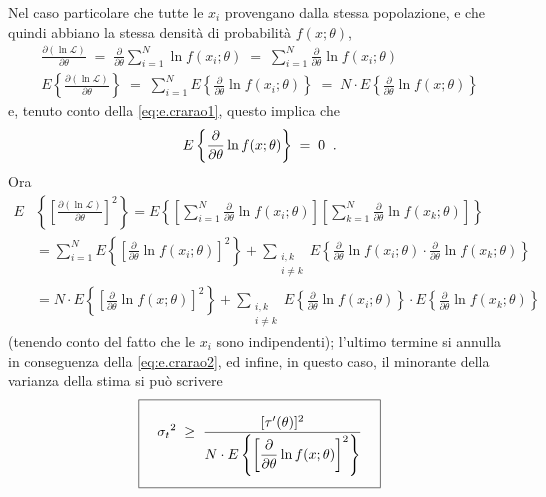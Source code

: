 Nel caso particolare che tutte le $x_i$ provengano dalla
stessa popolazione, e che quindi abbiano la stessa densit\`a
di probabilit\`a $f(x;\theta)$,
\begin{gather*}
  \frac{\partial (\ln  \mathcal{L})}{\partial \theta} \; =
    \; \frac{\partial}{\partial \theta} \sum_{i=1}^N \ln
    f(x_i; \theta) \; = \; \sum_{i=1}^N
    \frac{\partial}{\partial \theta} \ln f(x_i; \theta)
    \\[1ex]
  E \left\{ \frac{\partial (\ln \mathcal{L})}{\partial
    \theta} \right\} \; = \; \sum_{i=1}^N E \left\{
    \frac{\partial}{\partial \theta} \ln f(x_i; \theta)
    \right\} \; = \; N \cdot E \left\{
    \frac{\partial}{\partial \theta} \ln f(x; \theta)
    \right\}
\end{gather*}
e, tenuto conto della \eqref{eq:e.crarao1}, questo implica
che
\begin{equation} \label{eq:e.crarao2}
  E \left\{ \frac{\partial}{\partial \theta} \ln f(x;
    \theta) \right\} \; = \; 0 \;\; .
\end{equation}
Ora
\begin{equation*}
  \begin{split}
    E &\left\{ \left[ \frac{\partial (\ln
      \mathcal{L})}{\partial \theta} \right]^2 \right\} = E
      \left\{ \left[ \sum_{i=1}^N \frac{\partial}{\partial
      \theta} \ln f(x_i; \theta) \right] \left[ \sum_{k=1}^N
      \frac{\partial}{\partial \theta} \ln f(x_k; \theta)
      \right] \right\} \\[1ex]
    &= \sum_{i=1}^N E \left\{ \left[
      \frac{\partial}{\partial \theta} \ln f(x_i; \theta)
      \right]^2 \right\} + \sum_{\substack{i,k\\ i \ne k}} E
      \left\{ \frac{\partial}{\partial \theta} \ln f(x_i;
      \theta) \cdot \frac{\partial}{\partial \theta} \ln
      f(x_k; \theta) \right\} \\[1ex]
    &= N \cdot E \left\{ \left[ \frac{\partial}{\partial
      \theta} \ln f(x; \theta) \right]^2 \right\} +
      \sum_{\substack{i,k\\ i \ne k}} E \left\{
      \frac{\partial}{\partial \theta} \ln f(x_i; \theta)
      \right\} \cdot E \left\{ \frac{\partial}{\partial
      \theta} \ln f(x_k; \theta) \right\}
  \end{split}
\end{equation*}
(tenendo conto del fatto che le $x_i$ sono indipendenti);
l'ultimo termine si annulla in conseguenza della
\eqref{eq:e.crarao2}, ed infine, in questo caso, il
minorante della varianza della stima si pu\`o scrivere
\begin{equation*}
  \boxed{ \rule[-12mm]{0mm}{20mm} \quad
    {\sigma_t}^2 \; \ge \; \frac{[ \tau'(\theta) ]^2}{N
    \cdot E \left\{ \left[ \dfrac{\partial}{\partial \theta}
    \ln f(x; \theta) \right]^2 \right\} }
  \quad}
\end{equation*}


